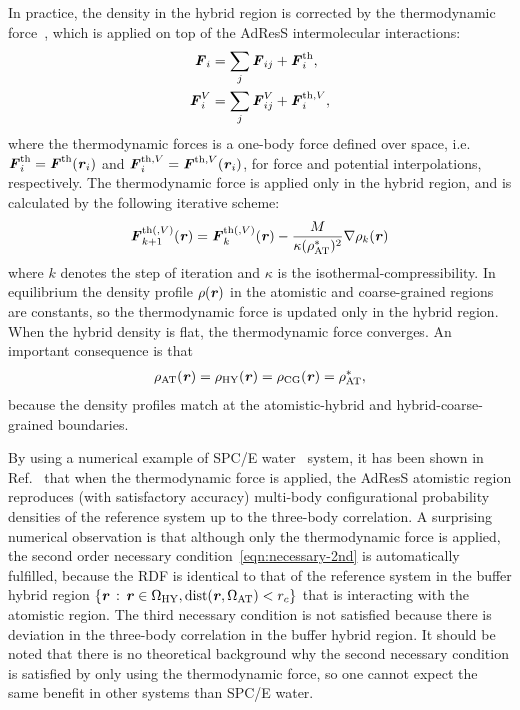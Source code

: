 \documentclass[epjST]{svjour}
\newcommand{\vect}[1]{\textbf{\textit{#1}}}
\newcommand{\dist}[0]{\textrm {dist}}
\newcommand{\AT}[0]{\textrm{AT}}
\newcommand{\HY}[0]{\textrm{HY}}
\newcommand{\CG}[0]{\textrm{CG}}
\newcommand{\moleidxone}[0]{i}
\newcommand{\moleidxtwo}[0]{j}
\newcommand{\thf}{{\textrm{th}}}
\begin{document}
In practice, the density in the hybrid region is corrected by the
thermodynamic force~\cite{fritsch2012adaptive}, which is applied on top of the AdResS intermolecular interactions:
\begin{align}\label{eqn:thf-f}
  \vect F_\moleidxone &= \sum_\moleidxtwo \vect F_{\moleidxone\moleidxtwo}  + \vect F_\moleidxone^\thf,  \\\label{eqn:thf-p}
  \vect F^V_\moleidxone& = \sum_\moleidxtwo \vect F^V_{\moleidxone\moleidxtwo} + \vect F_\moleidxone^{\thf,V},
\end{align}
where the thermodynamic forces is a one-body force defined over space,
i.e.~$\vect F^\thf_i = \vect F^\thf(\vect r_\moleidxone)$ and $\vect F^{\thf, V}_\moleidxone = \vect F^{\thf,V}(\vect r_\moleidxone)$,
for force and potential interpolations, respectively.
The thermodynamic force is applied only in the hybrid region, and is
calculated by the following iterative scheme:
\begin{align}\label{eqn:tfi}
  \vect F_{k+1}^{\thf(, V)} (\vect r) = \vect F_k^{\thf(, V)} (\vect r)-
  \frac{M}{\kappa(\rho^\ast_\AT)^2} \nabla\rho_k(\vect r)
\end{align}
where $k$ denotes the step of iteration and $\kappa$ is the
isothermal-compressibility. In equilibrium the density profile $\rho(\vect r)$ in the
atomistic and coarse-grained regions are constants, so the thermodynamic force
is updated only in the hybrid region. When the hybrid density is flat, the thermodynamic
force converges. An important consequence is that
\begin{align}
  \rho_\AT(\vect r) = \rho_\HY(\vect r) = \rho_\CG(\vect r) = \rho_\AT^\ast,
\end{align}
because the density profiles match at the atomistic-hybrid and
hybrid-coarse-grained boundaries.

By using a numerical example of SPC/E water~\cite{berendsen1987missing}
system, it has been shown in Ref.~\cite{wang2013grand} that when the
thermodynamic force is applied, the AdResS atomistic region reproduces (with satisfactory accuracy)
multi-body configurational probability densities of the reference system
up to the three-body correlation.
A surprising numerical observation is that although
only the thermodynamic force is applied, the second order necessary condition~\eqref{eqn:necessary-2nd}
is automatically fulfilled, because the RDF is identical to that of the reference system in the buffer hybrid region
$\{\vect r \,:\, \vect r \in\Omega_\HY, \dist(\vect r, \Omega_\AT) < r_c\}$ that is interacting with
the atomistic region. The third necessary condition is not satisfied because there is deviation
in the three-body correlation in the buffer hybrid region.
It should be noted that there is no theoretical background why the second necessary
condition is satisfied by only using the thermodynamic force,
so one cannot expect the same benefit in other systems than SPC/E water.
\end{document}
